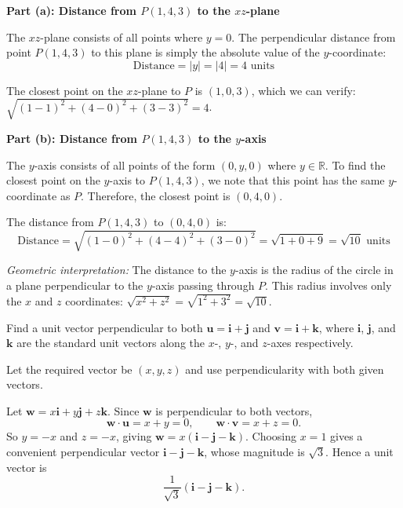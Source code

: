 \begin{solution}[Sketch]
\textbf{Part (a): Distance from $P(1, 4, 3)$ to the $xz$-plane}

The $xz$-plane consists of all points where $y = 0$. The perpendicular distance from point $P(1, 4, 3)$ to this plane is simply the absolute value of the $y$-coordinate:
$$\text{Distance} = |y| = |4| = 4 \text{ units}$$

The closest point on the $xz$-plane to $P$ is $(1, 0, 3)$, which we can verify: $\sqrt{(1-1)^2 + (4-0)^2 + (3-3)^2} = 4$.

\vspace{0.5em}

\textbf{Part (b): Distance from $P(1, 4, 3)$ to the $y$-axis}

The $y$-axis consists of all points of the form $(0, y, 0)$ where $y \in \mathbb{R}$. To find the closest point on the $y$-axis to $P(1, 4, 3)$, we note that this point has the same $y$-coordinate as $P$. Therefore, the closest point is $(0, 4, 0)$.

The distance from $P(1, 4, 3)$ to $(0, 4, 0)$ is:
$$\text{Distance} = \sqrt{(1-0)^2 + (4-4)^2 + (3-0)^2} = \sqrt{1 + 0 + 9} = \sqrt{10} \text{ units}$$

\textit{Geometric interpretation:} The distance to the $y$-axis is the radius of the circle in a plane perpendicular to the $y$-axis passing through $P$. This radius involves only the $x$ and $z$ coordinates: $\sqrt{x^2 + z^2} = \sqrt{1^2 + 3^2} = \sqrt{10}$.
\end{solution}

\vspace{1em}

\begin{problem}
Find a unit vector perpendicular to both $\mathbf{u} = \mathbf{i} + \mathbf{j}$ and $\mathbf{v} = \mathbf{i} + \mathbf{k}$, where $\mathbf{i}$, $\mathbf{j}$, and $\mathbf{k}$ are the standard unit vectors along the $x$-, $y$-, and $z$-axes respectively.
\end{problem}

\begin{hint}
Let the required vector be $(x,y,z)$ and use perpendicularity with both given vectors.
\end{hint}

\begin{solution}[Sketch]
Let $\mathbf{w} = x\mathbf{i} + y\mathbf{j} + z\mathbf{k}$. Since $\mathbf{w}$ is perpendicular to both vectors,
\[
\mathbf{w} \cdot \mathbf{u} = x + y = 0, \qquad \mathbf{w} \cdot \mathbf{v} = x + z = 0.
\]
So $y = -x$ and $z = -x$, giving $\mathbf{w} = x(\mathbf{i} - \mathbf{j} - \mathbf{k})$. Choosing $x = 1$ gives a convenient perpendicular vector $\mathbf{i} - \mathbf{j} - \mathbf{k}$, whose magnitude is $\sqrt{3}$. Hence a unit vector is
\[
\frac{1}{\sqrt{3}}(\mathbf{i} - \mathbf{j} - \mathbf{k}).
\]
\end{solution}


